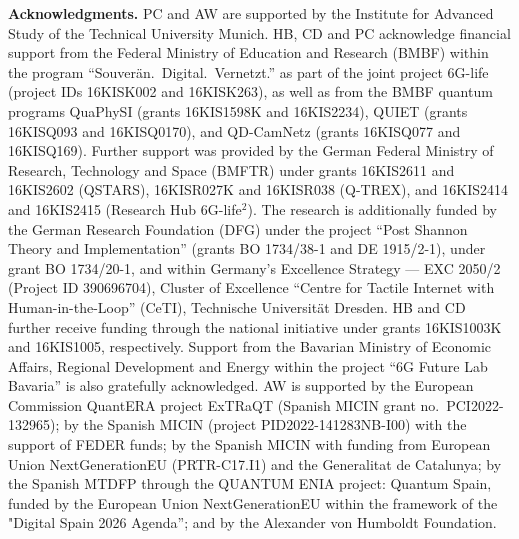 \documentclass[10pt,conference]{IEEEtran}
\newcommand{\1}{\mathds{1}}
\begin{document}
\bigskip
\noindent
{%
\textbf{Acknowledgments.} 
PC and AW are supported by the Institute for Advanced Study of the Technical University Munich. 
%
HB, CD and PC acknowledge financial support from the Federal Ministry of Education and Research (BMBF) within the program ``Souver\"an.\ Digital.\ Vernetzt.'' as part of the joint project 6G-life (project IDs 16KISK002 and 16KISK263), as well as from the BMBF quantum programs QuaPhySI (grants 16KIS1598K and 16KIS2234), QUIET (grants 16KISQ093 and 16KISQ0170), and QD-CamNetz (grants 16KISQ077 and 16KISQ169). Further support was provided by the German Federal Ministry of Research, Technology and Space (BMFTR) under grants 16KIS2611 and 16KIS2602 (QSTARS), 16KISR027K and 16KISR038 (Q-TREX), and 16KIS2414 and 16KIS2415 (Research Hub 6G-life$^2$). The research is additionally funded by the German Research Foundation (DFG) under the project ``Post Shannon Theory and Implementation'' (grants BO 1734/38-1 and DE 1915/2-1), under grant BO 1734/20-1, and within Germany’s Excellence Strategy --- EXC 2050/2 (Project ID 390696704), Cluster of Excellence ``Centre for Tactile Internet with Human-in-the-Loop'' (CeTI), Technische Universit\"at Dresden. HB and CD further receive funding through the national initiative under grants 16KIS1003K and 16KIS1005, respectively. Support from the Bavarian Ministry of Economic Affairs, Regional Development and Energy within the project ``6G Future Lab Bavaria'' is also gratefully acknowledged.
%
AW is supported by the European Commission QuantERA project ExTRaQT (Spanish MICIN grant no.~PCI2022-132965); by the Spanish MICIN (project PID2022-141283NB-I00) with the support of FEDER funds; by the Spanish MICIN with funding from European Union NextGenerationEU (PRTR-C17.I1) and the Generalitat de Catalunya; by the Spanish MTDFP through the QUANTUM ENIA project: Quantum Spain, funded by the European Union NextGenerationEU within the framework of the "Digital Spain 2026 Agenda”; and by the Alexander von Humboldt Foundation. 
}

\bigskip

\AtNextBibliography{\small}
\printbibliography
\end{document}
